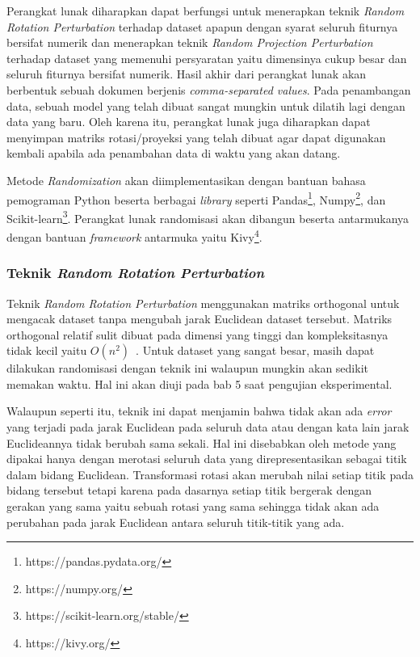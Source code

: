 Perangkat lunak diharapkan dapat berfungsi untuk menerapkan teknik \textit{Random Rotation Perturbation} terhadap dataset apapun dengan syarat seluruh fiturnya bersifat numerik dan menerapkan teknik \textit{Random Projection Perturbation} terhadap dataset yang memenuhi persyaratan yaitu dimensinya cukup besar dan seluruh fiturnya bersifat numerik. Hasil akhir dari perangkat lunak akan berbentuk sebuah dokumen berjenis \textit{comma-separated values}. Pada penambangan data, sebuah model yang telah dibuat sangat mungkin untuk dilatih lagi dengan data yang baru. Oleh karena itu, perangkat lunak juga diharapkan dapat menyimpan matriks rotasi/proyeksi yang telah dibuat agar dapat digunakan kembali apabila ada penambahan data di waktu yang akan datang.

Metode \textit{Randomization} akan diimplementasikan dengan bantuan bahasa pemograman Python beserta berbagai \textit{library} seperti Pandas\footnote{https://pandas.pydata.org/}, Numpy\footnote{https://numpy.org/}, dan Scikit-learn\footnote{https://scikit-learn.org/stable/}. Perangkat lunak randomisasi akan dibangun beserta antarmukanya dengan bantuan \textit{framework} antarmuka yaitu Kivy\footnote{https://kivy.org/}.

\subsubsection{Teknik \textit{Random Rotation Perturbation}}
\label{subsubsec:analisis-rrp}

Teknik \textit{Random Rotation Perturbation} menggunakan matriks orthogonal untuk mengacak dataset tanpa mengubah jarak Euclidean dataset tersebut. Matriks orthogonal relatif sulit dibuat pada dimensi yang tinggi dan kompleksitasnya tidak kecil yaitu \(O(n^2)\)~\cite{stewart:80:orthogonal}. Untuk dataset yang sangat besar, masih dapat dilakukan randomisasi dengan teknik ini walaupun mungkin akan sedikit memakan waktu. Hal ini akan diuji pada bab 5 saat pengujian eksperimental.

Walaupun seperti itu, teknik ini dapat menjamin bahwa tidak akan ada \textit{error} yang terjadi pada jarak Euclidean pada seluruh data atau dengan kata lain jarak Euclideannya tidak berubah sama sekali. Hal ini disebabkan oleh metode yang dipakai hanya dengan merotasi seluruh data yang direpresentasikan sebagai titik dalam bidang Euclidean. Transformasi rotasi akan merubah nilai setiap titik pada bidang tersebut tetapi karena pada dasarnya setiap titik bergerak dengan gerakan yang sama yaitu sebuah rotasi yang sama sehingga tidak akan ada perubahan pada jarak Euclidean antara seluruh titik-titik yang ada.


